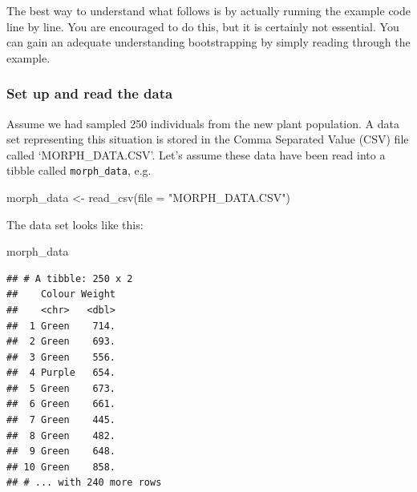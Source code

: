 \documentclass[
]{book}
\newenvironment{Shaded}{\begin{snugshade}}{\end{snugshade}}
\newcommand{\AttributeTok}[1]{\textcolor[rgb]{0.77,0.63,0.00}{#1}}
\newcommand{\FunctionTok}[1]{\textcolor[rgb]{0.00,0.00,0.00}{#1}}
\newcommand{\NormalTok}[1]{#1}
\newcommand{\OtherTok}[1]{\textcolor[rgb]{0.56,0.35,0.01}{#1}}
\newcommand{\StringTok}[1]{\textcolor[rgb]{0.31,0.60,0.02}{#1}}
\newenvironment{greybox}{
  \definecolor{shadecolor}{rgb}{0.95,0.95,0.95}  %
  \color{black}
  \begin{shaded}}
 {\end{shaded}}
\newenvironment{infobox}[1]
  {
  \begin{itemize}
  \renewcommand{\labelitemi}{
    \raisebox{-.7\height}[0pt][0pt]{
      {\setkeys{Gin}{width=3em,keepaspectratio}
        \texttt{[image: images/\#1]}}
    }
  }
  \setlength{\fboxsep}{1em}
  \begin{greybox}
  \item
  }
  {
  \end{greybox}
  \end{itemize}
  }
\begin{document}
\begin{infobox}{action}

\hypertarget{section}{%
\subsubsection*{}\label{section}}

The best way to understand what follows is by actually running the example code line by line. You are encouraged to do this, but it is certainly not essential. You can gain an adequate understanding bootstrapping by simply reading through the example.

\end{infobox}

\hypertarget{set-up-and-read-the-data}{%
\subsubsection*{Set up and read the data}\label{set-up-and-read-the-data}}

Assume we had sampled 250 individuals from the new plant population. A data set representing this situation is stored in the Comma Separated Value (CSV) file called `MORPH\_DATA.CSV'. Let's assume these data have been read into a tibble called \texttt{morph\_data}, e.g.

\begin{Shaded}
\begin{Highlighting}[]
\NormalTok{morph\_data }\OtherTok{\textless{}{-}} \FunctionTok{read\_csv}\NormalTok{(}\AttributeTok{file =} \StringTok{"MORPH\_DATA.CSV"}\NormalTok{)}
\end{Highlighting}
\end{Shaded}

The data set looks like this:

\begin{Shaded}
\begin{Highlighting}[]
\NormalTok{morph\_data}
\end{Highlighting}
\end{Shaded}

\begin{verbatim}
## # A tibble: 250 x 2
##    Colour Weight
##    <chr>   <dbl>
##  1 Green    714.
##  2 Green    693.
##  3 Green    556.
##  4 Purple   654.
##  5 Green    673.
##  6 Green    661.
##  7 Green    445.
##  8 Green    482.
##  9 Green    648.
## 10 Green    858.
## # ... with 240 more rows
\end{verbatim}
\end{document}
